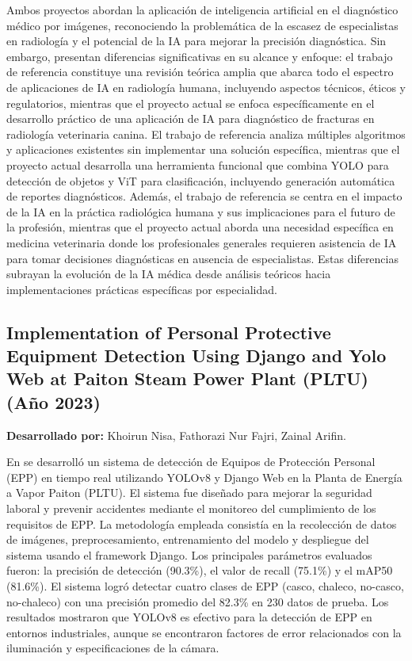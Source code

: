 {Ambos proyectos abordan la aplicación de inteligencia artificial en el diagnóstico médico por imágenes, reconociendo la problemática de la escasez de especialistas en radiología y el potencial de la IA para mejorar la precisión diagnóstica. Sin embargo, presentan diferencias significativas en su alcance y enfoque: el trabajo de referencia constituye una revisión teórica amplia que abarca todo el espectro de aplicaciones de IA en radiología humana, incluyendo aspectos técnicos, éticos y regulatorios, mientras que el proyecto actual se enfoca específicamente en el desarrollo práctico de una aplicación de IA para diagnóstico de fracturas en radiología veterinaria canina. El trabajo de referencia analiza múltiples algoritmos y aplicaciones existentes sin implementar una solución específica, mientras que el proyecto actual desarrolla una herramienta funcional que combina YOLO para detección de objetos y ViT para clasificación, incluyendo generación automática de reportes diagnósticos. Además, el trabajo de referencia se centra en el impacto de la IA en la práctica radiológica humana y sus implicaciones para el futuro de la profesión, mientras que el proyecto actual aborda una necesidad específica en medicina veterinaria donde los profesionales generales requieren asistencia de IA para tomar decisiones diagnósticas en ausencia de especialistas. Estas diferencias subrayan la evolución de la IA médica desde análisis teóricos hacia implementaciones prácticas específicas por especialidad.


\subsection{Implementation of Personal Protective Equipment Detection Using Django and Yolo Web at Paiton Steam Power Plant (PLTU) (A\~no 2023)}

\textbf{Desarrollado por:} Khoirun Nisa, Fathorazi Nur Fajri, Zainal Arifin.

En \cite{nisa2023} se desarroll\'o un sistema de detecci\'on de Equipos de Protecci\'on Personal (EPP) en tiempo real utilizando YOLOv8 y Django Web en la Planta de Energ\'ia a Vapor Paiton (PLTU). El sistema fue dise\~nado para mejorar la seguridad laboral y prevenir accidentes mediante el monitoreo del cumplimiento de los requisitos de EPP. La metodolog\'ia empleada consist\'ia en la recolecci\'on de datos de im\'agenes, preprocesamiento, entrenamiento del modelo y despliegue del sistema usando el framework Django. Los principales par\'ametros evaluados fueron: la precisi\'on de detecci\'on (90.3\%), el valor de recall (75.1\%) y el mAP50 (81.6\%). El sistema logr\'o detectar cuatro clases de EPP (casco, chaleco, no-casco, no-chaleco) con una precisi\'on promedio del 82.3\% en 230 datos de prueba. Los resultados mostraron que YOLOv8 es efectivo para la detecci\'on de EPP en entornos industriales, aunque se encontraron factores de error relacionados con la iluminaci\'on y especificaciones de la c\'amara.

}
